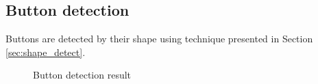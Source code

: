 \subsection{Button detection}
Buttons are detected by their shape using technique presented in Section \ref{sec:shape_detect}.

	\begin{figure}[H]
	    \centering
	    

	    \caption{Button detection result}
		\label{fig:btn_detect}
	\end{figure}


